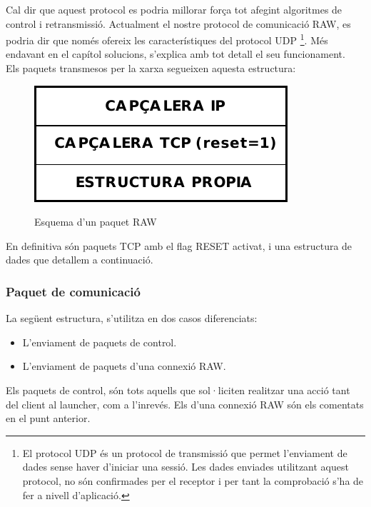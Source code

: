 Cal dir que aquest protocol es podria millorar força tot afegint algoritmes de control i retransmissió. Actualment
el nostre protocol de comunicació RAW, es podria dir que només ofereix les característiques del protocol UDP
\footnote{El protocol UDP és un protocol de transmissió que permet l'enviament de dades sense haver d'iniciar una 
sessió. Les dades enviades utilitzant aquest protocol, no són confirmades per el receptor i per tant la comprobació
s'ha de fer a nivell d'aplicació.}. Més endavant en el capítol solucions, s'explica amb tot detall el seu funcionament. \\

Els paquets transmesos per la xarxa segueixen aquesta estructura: \\

\begin{figure}[htp]
    \centering
    \includegraphics[scale=1,keepaspectratio]{diagrames/solutionDesignPacketStructure.pdf} \\
    \caption{Esquema d'un paquet RAW}
    \label{fig:packetScheme}
\end{figure}

En definitiva són paquets TCP amb el flag RESET activat, i una estructura de dades que detallem a continuació.

\subsubsection{Paquet de comunicació}

La següent estructura, s'utilitza en dos casos diferenciats:
\begin{itemize}
    \item L'enviament de paquets de control.
    \item L'enviament de paquets d'una connexió RAW.
\end{itemize}

Els paquets de control, són tots aquells que sol·liciten realitzar una acció tant del client al launcher, com a l'inrevés.
Els d'una connexió RAW són els comentats en el punt anterior.

